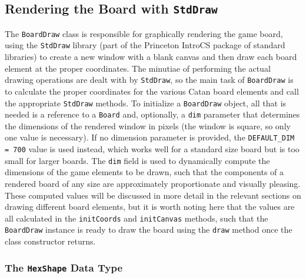 \documentclass[pageno]{jpaper}
\begin{document}
\begin{doublespacing}
\hypertarget{sec:rendering_the_board_with_stddraw}{}
\subsection{Rendering the Board with \lstinline$StdDraw$ \cite{princetoncs}}

The \lstinline$BoardDraw$ class is responsible for graphically rendering the game board, using the \lstinline$StdDraw$ library (part of the Princeton IntroCS package of standard libraries) to create a new window with a blank canvas and then draw each board element at the proper coordinates. The minutiae of performing the actual drawing operations are dealt with by \lstinline$StdDraw$, so the main task of \lstinline$BoardDraw$ is to calculate the proper coordinates for the various Catan board elements and call the appropriate \lstinline$StdDraw$ methods. To initialize a \lstinline$BoardDraw$ object, all that is needed is a reference to a \lstinline$Board$ and, optionally, a \lstinline$dim$ parameter that determines the dimensions of the rendered window in pixels (the window is square, so only one value is necessary). If no dimension parameter is provided, the \lstinline$DEFAULT_DIM = 700$ value is used instead, which works well for a standard size board but is too small for larger boards. The \lstinline$dim$ field is used to dynamically compute the dimensions of the game elements to be drawn, such that the components of a rendered board of any size are approximately proportionate and visually pleasing. These computed values will be discussed in more detail in the relevant sections on drawing different board elements, but it is worth noting here that the values are all calculated in the \lstinline$initCoords$ and \lstinline$initCanvas$ methods, such that the \lstinline$BoardDraw$ instance is ready to draw the board using the \lstinline$draw$ method once the class constructor returns.

\hypertarget{sec:the_hexshape_data_type}{}
\subsubsection{The \lstinline$HexShape$ Data Type}


\end{doublespacing}
\end{document}
